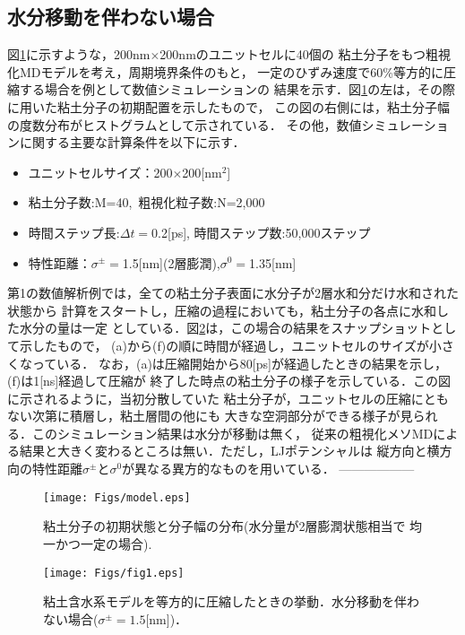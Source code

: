 ﻿\documentclass[11pt,a4j]{jarticle}
\begin{document}
\subsection{水分移動を伴わない場合}
図\ref{fig:fig1}に示すような，200nm$\times$200nmのユニットセルに40個の
粘土分子をもつ粗視化MDモデルを考え，周期境界条件のもと，
一定のひずみ速度で60\%等方的に圧縮する場合を例として数値シミュレーションの
結果を示す．図\ref{fig:fig1}の左は，その際に用いた粘土分子の初期配置を示したもので，
この図の右側には，粘土分子幅の度数分布がヒストグラムとして示されている．
その他，数値シミュレーションに関する主要な計算条件を以下に示す．
\begin{itemize}
\item
ユニットセルサイズ：200$\times$200[nm$^2$]
\item
粘土分子数:M=40,\, 粗視化粒子数:N=2,000
\item
時間ステップ長:$\Delta t=$0.2[ps], 時間ステップ数:50,000ステップ
\item
特性距離：$\sigma^\pm=$1.5[nm](2層膨潤),$\sigma^0=$1.35[nm]
\end{itemize}
第1の数値解析例では，全ての粘土分子表面に水分子が2層水和分だけ水和された状態から
計算をスタートし，圧縮の過程においても，粘土分子の各点に水和した水分の量は一定
としている．図\ref{fig:fig2}は，この場合の結果をスナップショットとして示したもので，
(a)から(f)の順に時間が経過し，ユニットセルのサイズが小さくなっている．
なお，(a)は圧縮開始から80[ps]が経過したときの結果を示し，(f)は1[ns]経過して圧縮が
終了した時点の粘土分子の様子を示している．この図に示されるように，当初分散していた
粘土分子が，ユニットセルの圧縮にともない次第に積層し，粘土層間の他にも
大きな空洞部分ができる様子が見られる．このシミュレーション結果は水分が移動は無く，
従来の粗視化メソMDによる結果と大きく変わるところは無い．ただし，LJポテンシャルは
縦方向と横方向の特性距離$\sigma^\pm$と$\sigma^0$が異なる異方的なものを用いている．
------------------
\begin{figure}[h]
	\begin{center}
	\texttt{[image: Figs/model.eps]} 
	\end{center}
	\caption{
		粘土分子の初期状態と分子幅の分布(水分量が2層膨潤状態相当で
		均一かつ一定の場合).
	} 
	\label{fig:fig1}
\end{figure}
\begin{figure}[h]
	\begin{center}
	\texttt{[image: Figs/fig1.eps]} 
	\end{center}
	\caption{
		粘土含水系モデルを等方的に圧縮したときの挙動．水分移動を伴わない場合($\sigma^\pm=1.5$[nm])．
	} 
	\label{fig:fig2}
\end{figure}
\end{document}
